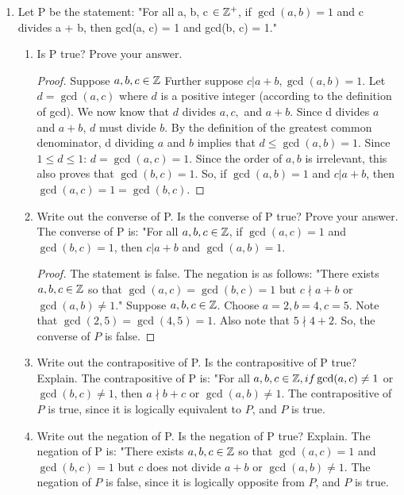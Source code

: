 \documentclass{article}
\begin{document}
\begin{enumerate}
\begin{enumerate}[label=(\alph*)]
\begin{proof}
\end{proof}

\end{enumerate}
\item Let P be the statement: "For all a, b, c $\in\mathbb{Z}^+$, if $\gcd(a, b) = 1$ and c divides a + b, then
gcd(a, c) = 1 and gcd(b, c) = 1."
\begin{enumerate}[label=(\alph*)] 
    \item Is P true? Prove your answer.
    \nl \begin{proof}
        Suppose $a,b,c \in\mathbb{Z}$
        \nl Further suppose $c|a+b, \gcd(a,b)=1$.
        \nl Let $d = \gcd(a,c)$ where $d$ is a positive integer (according to the definition of gcd).
        \nl We now know that $d$ divides $a,c, $ and $ a+b$.
        \nl Since d divides $a$ and $a+b$, $d$ must divide $b$.
        \nl By the definition of the greatest common denominator, d dividing $a$ and $b$
        implies that $d\leq\gcd(a,b)=1$.
        \nl Since $1\leq d\leq1$:
        \nl $d=\gcd(a,c)=1$.
        \nl Since the order of $a,b$ is irrelevant, this also proves that $\gcd(b,c)=1$.
        \nl So, if $\gcd(a,b)=1$ and $c|a+b$, then $\gcd(a,c)=1=\gcd(b,c)$.
    \end{proof}
    \item Write out the converse of P. Is the converse of P true? Prove your answer.
    \nl \nl The converse of P is: "For all $a, b, c \in \mathbb{Z}$, if $\gcd(a,c) = 1$ and
    $\gcd (b,c)=1$, then $c | a+b $ and $\gcd(a,b)=1$.
    \nl \begin{proof}
        The statement is false. The negation is as follows:
        \nl "There exists $a,b,c \in\mathbb{Z}$ so that $\gcd(a,c)=\gcd(b,c)=1$ but
        $c \nmid a+b$ or $\gcd(a,b)\neq1$."
        Suppose $a, b, c \in\mathbb{Z}$.
        \nl Choose $a=2,b=4,c=5$.
        \nl Note that $\gcd(2,5)=\gcd(4,5)=1$.
        \nl Also note that $5\nmid4+2$.
        \nl So, the converse of $P$ is false.
    \end{proof}
    \item Write out the contrapositive of P. Is the contrapositive of P true? Explain.
    \nl \nl The contrapositive of P is: "For all $a, b, c \in\mathbb{Z}, if \gcd(a,c)\neq1$ or 
    $\gcd(b,c) \neq1$, then $a \nmid b+c$ or $\gcd(a,b) \neq1$.
    \nl The contrapositive of $P$ is true, since it is logically equivalent to $P$, and $P$ is true.
    \item Write out the negation of P. Is the negation of P true? Explain.
    \nl \nl The negation of P is: "There exists $a, b, c \in\mathbb{Z}$ so that 
    $\gcd(a,c)=1$ and $\gcd(b,c) = 1$ but $c$ does not divide $a+b$ or $\gcd(a,b) \neq1$.
    \nl The negation of $P$ is false, since it is logically opposite from $P$, and $P$ is true.
    

\end{enumerate}
\end{enumerate}
\end{document}
